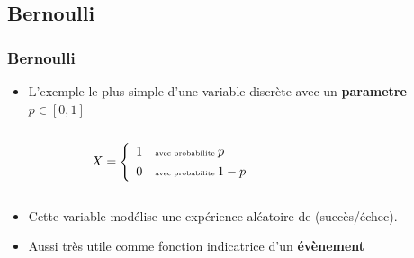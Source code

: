 \documentclass{beamer}
\begin{document}
\subsection{Bernoulli}
\begin{frame}[t]
  \frametitle{Bernoulli}
  \begin{itemize}
    \scriptsize
    \item L'exemple le plus simple d'une variable discrète avec un
      \alert{\textbf{parametre $p\in [0,1]$}} 
      \pause
      \vspace*{.5cm}
      \begin{columns}
        \begin{column}{0.5\textwidth}
         \begin{equation*}
           X = \left\{
             \begin{array}{l l}
               1  & \text{\tiny avec probabilite } p\\[4pt]
               0  & \text{\tiny avec probabilite } 1-p
             \end{array}
           \right.
         \end{equation*} 
        \end{column}
        \begin{column}{0.5\textwidth}
          \begin{center}
          \end{center}
        \end{column}
      \end{columns}
        \item Cette variable modélise une expérience aléatoire de
          (succès/échec).\\[4pt]

        \item Aussi très utile comme fonction indicatrice d'un
          \textbf{évènement}
        

\end{itemize}
\end{frame}
\end{document}
